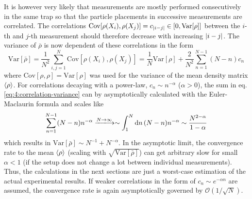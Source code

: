 It is however very likely that measurements are mostly performed consecutively in the same trap so that the particle placements in successive measurements are correlated.
The correlations $\mathrm{Cov}[\rho(X_i), \rho(X_j)] = c_{\left\lvert i-j\right\rvert} \in [0, \mathrm{Var}[\rho]]$ between the $i$-th and $j$-th measurement should therefore decrease with increasing $\left\lvert i-j\right\rvert$.
The variance of $\bar{\rho}$ is now dependent of these correlations in the form \cite[p. 1227]{Riley_2018}
\begin{equation}\label{eq:4:correlation-variance}
  \mathrm{Var}[\bar{\rho}] = \frac{1}{N^2} \sum_{i,j=1}^{N} \mathrm{Cov}[\rho(X_i), \rho(X_j)] = \frac{1}{N}\mathrm{Var}[\rho] + \frac{2}{N^2}\sum_{n=1}^{N - 1}(N - n) c_n
\end{equation}
where $\mathrm{Cov}[\rho, \rho] = \mathrm{Var}[\rho]$ was used for the variance of the mean density matrix $\left\langle\rho\right\rangle$.
For correlations decaying with a power-law, $c_n \sim n^{-\alpha}$ ($\alpha > 0$), the sum in eq. \eqref{eq:4:correlation-variance} can by asymptotically calculated with the Euler-Maclaurin formula and scales like
\begin{equation}
  \sum_{n=1}^{N - 1}(N - n)n^{-\alpha} \xlongrightarrow{N\rightarrow\infty} \sim \int_1^{N}\dd n \, (N-n)n^{-\alpha} \sim \frac{N^{2-\alpha}}{1-\alpha}
\end{equation}
which results in $\mathrm{Var}[\bar{\rho}] \sim N^{-1} + N^{-\alpha}$. 
In the asymptotic limit, the convergence rate to the mean $\left\langle\rho\right\rangle$ (scaling with $\sqrt{\mathrm{Var}[\bar{\rho}]}$) can get arbitrary slow for small $\alpha < 1$ (if the setup does not change a lot between individual measurements).
Thus, the calculations in the next sections are just a worst-case estimation of the actual experimental results.
If weaker correlations in the form of $c_n \sim e^{-\alpha n}$ are assumed, the convergence rate is again asymptotically governed by $\mathcal{O}(1/\sqrt{N})$.









